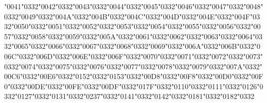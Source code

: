 \documentclass[landscape]{article}
\newcommand{\gs}{\hspace{0.5mm}}	%
\begin{document}
	\char"0041\char"0332\gs \char"0042\char"0332\gs \char"0043\char"0332\gs \char"0044\char"0332\gs \char"0045\char"0332\gs \char"0046\char"0332\gs \char"0047\char"0332\gs \char"0048\char"0332\gs \char"0049\char"0332\gs \char"004A\char"0332\gs \char"004B\char"0332\gs \char"004C\char"0332\gs \char"004D\char"0332\gs \char"004E\char"0332\gs \char"004F\char"0332\gs \char"0050\char"0332\gs \char"0051\char"0332\gs \char"0052\char"0332\gs \char"0053\char"0332\gs \char"0054\char"0332\gs \char"0055\char"0332\gs \char"0056\char"0332\gs \char"0057\char"0332\gs \char"0058\char"0332\gs \char"0059\char"0332\gs \char"005A\char"0332\gs \char"0061\char"0332\gs \char"0062\char"0332\gs \char"0063\char"0332\gs \char"0064\char"0332\gs \char"0065\char"0332\gs \char"0066\char"0332\gs \char"0067\char"0332\gs \char"0068\char"0332\gs \char"0069\char"0332\gs \char"006A\char"0332\gs \char"006B\char"0332\gs \char"006C\char"0332\gs \char"006D\char"0332\gs \char"006E\char"0332\gs \char"006F\char"0332\gs \char"0070\char"0332\gs \char"0071\char"0332\gs \char"0072\char"0332\gs \char"0073\char"0332\gs \char"0074\char"0332\gs \char"0075\char"0332\gs \char"0076\char"0332\gs \char"0077\char"0332\gs \char"0078\char"0332\gs \char"0079\char"0332\gs \char"007A\char"0332\gs \char"00C6\char"0332\gs \char"00E6\char"0332\gs \char"0152\char"0332\gs \char"0153\char"0332\gs \char"00D8\char"0332\gs \char"00F8\char"0332\gs \char"00D0\char"0332\gs \char"00F0\char"0332\gs \char"00DE\char"0332\gs \char"00FE\char"0332\gs \char"00DF\char"0332\gs \char"017F\char"0332\gs \char"0110\char"0332\gs \char"0111\char"0332\gs \char"0126\char"0332\gs \char"0127\char"0332\gs \char"0131\char"0332\gs \char"0237\char"0332\gs \char"0141\char"0332\gs \char"0142\char"0332\gs \char"0181\char"0332\gs \char"0182\char"0332
\end{document}
